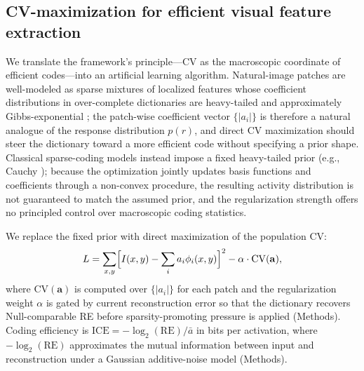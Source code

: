 \subsection{CV-maximization for efficient visual feature extraction}
\label{sec:cv_algorithm}

We translate the framework's principle---CV as the macroscopic coordinate of efficient codes---into an artificial learning algorithm.  Natural-image patches are well-modeled as sparse mixtures of localized features whose coefficient distributions in over-complete dictionaries are heavy-tailed and approximately Gibbs-exponential \cite{13,field_relations_1987}; the patch-wise coefficient vector $\{|a_i|\}$ is therefore a natural analogue of the response distribution $p(r)$, and direct CV maximization should steer the dictionary toward a more efficient code without specifying a prior shape.  Classical sparse-coding models \cite{37} instead impose a fixed heavy-tailed prior (e.g., Cauchy \cite{38}); because the optimization jointly updates basis functions and coefficients through a non-convex procedure, the resulting activity distribution is not guaranteed to match the assumed prior, and the regularization strength offers no principled control over macroscopic coding statistics.

We replace the fixed prior with direct maximization of the population CV:
\begin{align}
L = \sum_{x,y} \Bigl[ I(x,y) - \sum_i a_i \phi_i(x,y) \Bigr]^2 - \alpha \cdot \mathrm{CV}(\mathbf{a}),
\end{align}
where $\mathrm{CV}(\mathbf{a})$ is computed over $\{|a_i|\}$ for each patch and the regularization weight $\alpha$ is gated by current reconstruction error so that the dictionary recovers Null-comparable RE before sparsity-promoting pressure is applied (Methods).  Coding efficiency is $\mathrm{ICE} = -\log_2(\mathrm{RE})/\bar{a}$ in bits per activation, where $-\log_2(\mathrm{RE})$ approximates the mutual information between input and reconstruction under a Gaussian additive-noise model (Methods).

